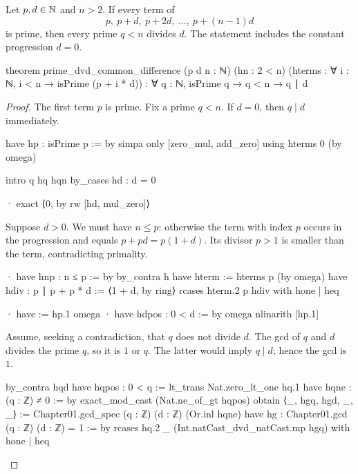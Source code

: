 \begin{theorem}
  \label{ent:thm:prime-progression-common-difference}
  Let $p,d\in\mathbb{N}$ and $n>2$.
  If every term of
  \[
    p,\ p+d,\ p+2d,\ \ldots,\ p+(n-1)d
  \]
  is prime, then every prime $q<n$ divides $d$.
  The statement includes the constant progression $d=0$.

  \begin{lean}
    theorem prime_dvd_common_difference (p d n : ℕ) (hn : 2 < n)
        (hterms : ∀ i : ℕ, i < n → isPrime (p + i * d)) :
        ∀ q : ℕ, isPrime q → q < n → q ∣ d
  \end{lean}
\end{theorem}

\begin{proof}
  The first term $p$ is prime.
  Fix a prime $q<n$.
  If $d=0$, then $q\mid d$ immediately.

  \begin{lean}
    have hp : isPrime p := by
      simpa only [zero_mul, add_zero] using hterms 0 (by omega)

    intro q hq hqn
    by_cases hd : d = 0

    · exact ⟨0, by rw [hd, mul_zero]⟩
  \end{lean}

  Suppose $d>0$.
  We must have $n\le p$: otherwise the term with index $p$ occurs in the progression and equals
  $p+pd=p(1+d)$.
  Its divisor $p>1$ is smaller than the term, contradicting primality.

  \begin{lean}
    · have hnp : n ≤ p := by
        by_contra h
        have hterm := hterms p (by omega)
        have hdiv : p ∣ p + p * d := ⟨1 + d, by ring⟩
        rcases hterm.2 p hdiv with hone | heq

        · have := hp.1
          omega
        · have hdpos : 0 < d := by
            omega
          nlinarith [hp.1]
  \end{lean}

  Assume, seeking a contradiction, that $q$ does not divide $d$.
  The gcd of $q$ and $d$ divides the prime $q$, so it is $1$ or $q$.
  The latter would imply $q\mid d$; hence the gcd is $1$.

  \begin{lean}
    by_contra hqd
    have hqpos : 0 < q := lt_trans Nat.zero_lt_one hq.1
    have hqne : (q : ℤ) ≠ 0 := by
      exact_mod_cast (Nat.ne_of_gt hqpos)
    obtain ⟨_, hgq, hgd, _, _⟩ :=
      Chapter01.gcd_spec (q : ℤ) (d : ℤ) (Or.inl hqne)
    have hg : Chapter01.gcd (q : ℤ) (d : ℤ) = 1 := by
      rcases hq.2 _ (Int.natCast_dvd_natCast.mp hgq) with hone | heq


\end{lean}
\end{proof}
